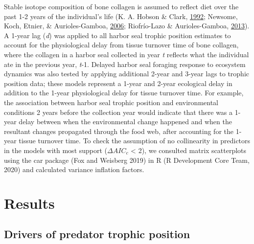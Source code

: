 \documentclass [11pt, proquest] {uwthesis}[2015/03/03]
\begin{document}
Stable isotope composition of bone collagen is assumed to reflect diet
over the past 1-2 years of the individual's life (K. A. Hobson \& Clark,
\protect\hyperlink{ref-Hobson1992}{1992}; Newsome, Koch, Etnier, \&
Aurioles-Gamboa, \protect\hyperlink{ref-Newsome2006}{2006}; Riofrío-Lazo
\& Aurioles-Gamboa, \protect\hyperlink{ref-Riofrio2013}{2013}). A 1-year
lag (\emph{d}) was applied to all harbor seal trophic position estimates
to account for the physiological delay from tissue turnover time of bone
collagen, where the collagen in a harbor seal collected in year \emph{t}
reflects what the individual ate in the previous year, \emph{t}-1.
Delayed harbor seal foraging response to ecosystem dynamics was also
tested by applying additional 2-year and 3-year lags to trophic position
data; these models represent a 1-year and 2-year ecological delay in
addition to the 1-year physiological delay for tissue turnover time. For
example, the association between harbor seal trophic position and
environmental conditions 2 years before the collection year would
indicate that there was a 1-year delay between when the environmental
change happened and when the resultant changes propagated through the
food web, after accounting for the 1-year tissue turnover time. To check
the assumption of no collinearity in predictors in the models with most
support (\(\Delta AIC_c\) \textless{} 2), we consulted matrix
scatterplots using the car package (Fox and Weisberg 2019) in R (R
Development Core Team, 2020) and calculated variance inflation factors.

\section{Results}\label{results-2}

\subsection{Drivers of predator trophic
position}\label{drivers-of-predator-trophic-position}
\end{document}
